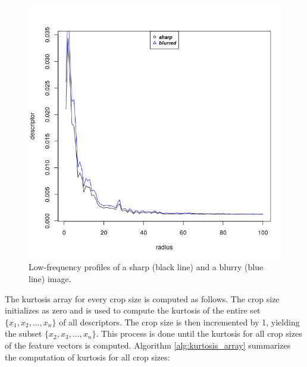 \begin{figure}[htb]
	\centering
	\caption{Low-frequency profiles of a sharp (black line) and a blurry (blue line) image.}
	\label{fig:low_frequencies}
	\includegraphics[scale=2.2, trim = 0 0.3cm 0 0.4cm, clip]{images/low_frequencies.png}
	\centering
	\fautor
\end{figure}

The kurtosis array for every crop size is computed as follows. The crop size initializes as zero and is used to compute the kurtosis of the entire set $\{x_{1},x_{2},...,x_{n}\}$ of all descriptors. The crop size is then incremented by 1, yielding the subset $\{x_{2},x_{3},...,x_{n}\}$. This process is done until the kurtosis for all crop sizes of the feature vectors is computed. Algorithm \ref{alg:kurtosis_array} summarizes the computation of kurtosis for all crop sizes:

